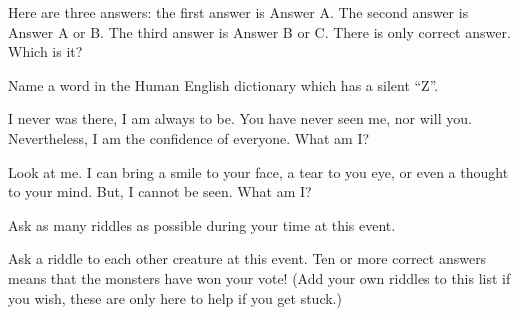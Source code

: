 \documentclass[green]{guildcamp2}
\begin{document}
\begin{enum}
	\item Here are three answers: the first answer is Answer A. The second answer is Answer A or B. The third answer is Answer B or C. There is only correct answer. Which is it?
	
	\item Name a word in the Human English dictionary which has a silent ``Z''.
	
	\item I never was there, I am always to be. You have never seen me, nor will you. Nevertheless, I am the confidence of everyone. What am I?
	
	\item Look at me. I can bring a smile to your face, a tear to you eye, or even a thought to your mind. But, I cannot be seen. What am I?
\end{enum}

\begin{enum}[Directions]
	\item Ask as many riddles as possible during your time at this event.
	\item Ask a riddle to each other creature at this event. Ten or more correct answers means that the monsters have won your vote! (Add your own riddles to this list if you wish, these are only here to help if you get stuck.)
	\end{enum}
\end{document}
